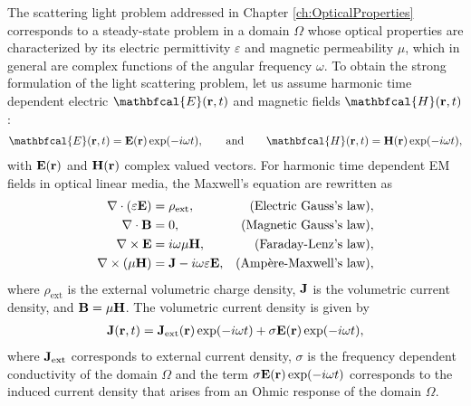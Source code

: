 
The scattering light problem addressed in Chapter \ref{ch:OpticalProperties} corresponds to a steady-state problem in a domain $\Omega$ whose optical properties are characterized by its electric permittivity $\varepsilon$ and magnetic permeability $\mu$, which in general are complex functions of the angular frequency $\omega$. To obtain the strong formulation of the light scattering problem, let us assume harmonic time dependent electric $\mathbfcal{E}(\vb{r},t)$ and magnetic fields $\mathbfcal{H}(\vb{r},t)$:
%
\begin{align}
    \mathbfcal{E}(\vb{r},t) = \vb{E}(\vb{r})\exp(-i\omega t),
        \qquad
        \text{and}
        \qquad
    \mathbfcal{H}(\vb{r},t) =  \vb{H}(\vb{r}) \exp(-i\omega t),
\end{align}
%
with $ \vb{E}(\vb{r})$ and $ \vb{H}(\vb{r})$ complex valued vectors. For harmonic time dependent EM fields in optical linear media, the Maxwell's equation are rewritten as \cite{jackson_classical_1999}
%
%
%
\begin{subequations}
    \label{eq:MaxwellsEq}
\begin{align}
    \nabla \cdot \qty(\varepsilon \vb{E})  &= \rho_\text{ext},  &\mbox{(Electric Gauss's law)},\\
    \nabla \cdot   \vb{B} &= 0, & \mbox{(Magnetic Gauss's law)},
            \label{eq:GaussM}\\
    \nabla \times \vb{E}  &= i\omega \mu \vb{H},  &  \mbox{(Faraday-Lenz's law)},\\
    \nabla \times \qty(\mu \vb{H})  &= \vb{J} - i\omega \varepsilon \vb{E}, & \mbox{(Ampère-Maxwell's law)},
\end{align}
\end{subequations}
%
where  $\rho_\text{ext}$ is the external volumetric charge density, $\vb{J}$ is the volumetric current density, and  $\vb{B} = \mu \vb{H}$. The volumetric current density is given by \cite{jackson_classical_1999}
%
\begin{align}
    \vb{J}(\vb{r},t) = \vb{J}_\text{ext}(\vb{r})\exp(-i\omega t) + \sigma \vb{E}(\vb{r})\exp(-i\omega t),
    \label{eq:ohmic}
\end{align}
%
where $\vb{J}_\text{ext}$ corresponds to external current density, $\sigma$ is the frequency dependent conductivity of the domain $\Omega$ and the term $\sigma \vb{E}(\vb{r})\exp(-i\omega t)$ corresponds to the induced current density that arises from an Ohmic response of the domain $\Omega$.

